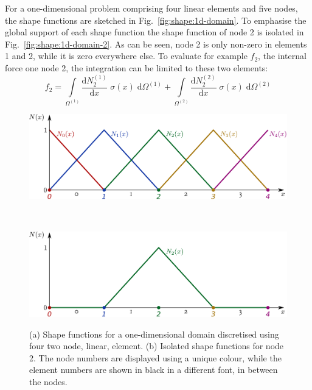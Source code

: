 \documentclass[times,namecite]{goose-article}
\begin{document}
For a one-dimensional problem comprising four linear elements and five nodes, the shape functions are sketched in Fig.~\ref{fig:shape:1d-domain}. To emphasise the global support of each shape function the shape function of node 2 is isolated in Fig.~\ref{fig:shape:1d-domain-2}. As can be seen, node 2 is only non-zero in elements 1 and 2, while it is zero everywhere else. To evaluate for example $f_2$, the internal force one node 2, the integration can be limited to these two elements:
\begin{equation}
  f_2
  =
  \int\limits_{\Omega^{(1)}}
    \frac{\mathrm{d} N^{(1)}_2}{\mathrm{d} x} \;
    \sigma (x) \;
  \mathrm{d}\Omega^{(1)}
  +
  \int\limits_{\Omega^{(2)}}
    \frac{\mathrm{d} N^{(2)}_2}{\mathrm{d} x} \;
    \sigma (x) \;
  \mathrm{d}\Omega^{(2)}
\end{equation}

\begin{figure}[htp]
  \centering
  \captionsetup[subfigure]{justification=centering}
  \begin{minipage}[t]{.5\textwidth}
    \centering
    \includegraphics[width=1.\textwidth]{figures/shape-functions-1d.pdf}
    \label{fig:shape:1d-domain}
  \end{minipage}
  \\
  \begin{minipage}[t]{.5\textwidth}
    \centering
    \includegraphics[width=1.\textwidth]{figures/shape-functions-1d-node-2.pdf}
    \label{fig:shape:1d-domain-2}
  \end{minipage}
  \caption{(a) Shape functions for a one-dimensional domain discretised using four two node, linear, element. (b) Isolated shape functions for node 2. The node numbers are displayed using a unique colour, while the element numbers are shown in black in a different font, in between the nodes.}
  \label{fig:shape:1d-domain:fig}
\end{figure}
\end{document}
